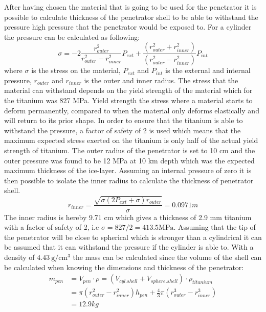 After having chosen the material that is going to be used for the penetrator it is possible to calculate thickness of the penetrator shell to be able to withstand the pressure high pressure that the penetrator would be exposed to. For a cylinder the pressure can be calculated as following\cite{website:cylinderpressure}:  
\begin{equation}\label{eq:pressure}
\sigma = -2\frac{r_{outer}^2}{r_{outer}^2-r_{inner}^2}P_{ext} + \frac{(r_{outer}^2+r_{inner}^2)}{(r_{outer}^2-r_{inner}^2)}P_{int}
\end{equation}
where $\sigma$ is the stress on the material, $P_{ext}$ and $P_{int}$ is the external and internal pressure, $r_{outer}$ and $r_{inner}$ is the outer and inner radius. The stress that the material can withstand depends on the yield strength of the material which for the titanium was 827 MPa. Yield strength the stress where a material starts to deform permanently, compared to when the material only deforms elastically and will return to its prior shape. In order to ensure that the titanium is able to withstand the pressure, a factor of safety of 2 is used which means that the maximum expected stress exerted on the titanium is only half of the actual yield strength of titanium. The outer radius of the penetrator is set to 10 cm and the outer pressure was found to be 12 MPa at 10 km depth which was the expected maximum thickness of the ice-layer. Assuming an internal pressure of zero it is then possible to isolate the inner radius to calculate the thickness of penetrator shell. 
\begin{equation}
r_{inner} = \frac{\sqrt{\sigma(2P_{ext}+\sigma)r_{outer}}}{\sigma} = 0.0971 m
\end{equation}
The inner radius is hereby 9.71 cm which gives a thickness of 2.9 mm titanium with a factor of safety of 2, i.e $\sigma = 827/2 = 413.5 \text{MPa}$. Assuming that the tip of the penetrator will be close to spherical which is stronger than a cylindrical it can be assumed that it can withstand the pressure if the cylinder is able to. With a density of $\SI{4.43} {\gram\per\cubic\cm}$ the mass can be calculated since the volume of the shell can be calculated when knowing the dimensions and thickness of the penetrator: 
\begin{equation}
\begin{aligned}
m_{pen} & = V_{pen}\cdot \rho = \left(V_{cyl. shell}+V_{sphere. shell}\right) \cdot \rho_{titanium} \\
& = \pi(r_{outer}^2-r_{inner}^2)h_{pen} + \frac{4}{3}\pi(r_{outer}^3-r_{inner}^3)\\
& = 12.9 kg
\end{aligned}
\end{equation}
